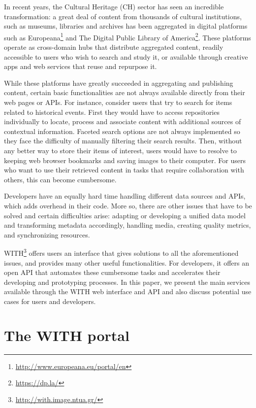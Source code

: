 \documentclass[runningheads,a4paper]{llncs}
\begin{document}
In recent years, the Cultural Heritage (CH) sector has seen an incredible transformation: a great deal of content from thousands of cultural institutions, such as museums, libraries and archives has been aggregated in digital platforms such as Europeana\footnote{\url{http://www.europeana.eu/portal/en}} and The Digital Public Library of America\footnote{\url{https://dp.la/}}. These platforms operate as cross-domain hubs that distribute aggregated content, readily accessible to users who wish to search and study it, or available through creative apps and web services that reuse and repurpose it. 

While these platforms have greatly succeeded in aggregating and publishing content, certain basic functionalities are not always available directly from their web pages or APIs. For instance, consider users that try to search for items related to historical events. First they would have to access repositories individually to locate, process and associate content with additional sources of contextual information. Faceted search options are not always implemented so they face the difficulty of manually filtering their search results. Then, without any better way to store their items of interest, users would have to resolve to keeping web browser bookmarks and saving images to their computer. For users who want to use their retrieved content in tasks that require collaboration with others, this can become cumbersome. 

Developers have an equally hard time handling different data sources and APIs, which adds overhead in their code. More so, there are other issues that have to be solved and certain difficulties arise: adapting or developing a unified data model and transforming metadata accordingly, handling media, creating quality metrics, and synchronizing resources. 

WITH\footnote{\url{http://with.image.ntua.gr/}} offers users an interface that gives solutions to all the aforementioned issues, and provides many other useful functionalities. For developers, it offers an open API that automates these cumbersome tasks and accelerates their developing and prototyping processes. In this paper, we present the main services available through the WITH web interface and API and also discuss potential use cases for users and developers.

\section{The WITH portal}
\end{document}
